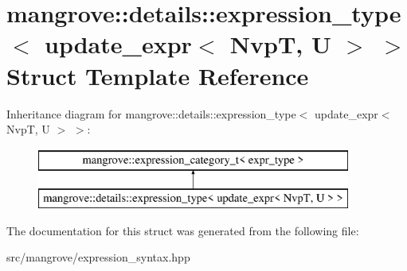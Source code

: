 \hypertarget{structmangrove_1_1details_1_1expression__type_3_01update__expr_3_01NvpT_00_01U_01_4_01_4}{}\section{mangrove\+:\+:details\+:\+:expression\+\_\+type$<$ update\+\_\+expr$<$ NvpT, U $>$ $>$ Struct Template Reference}
\label{structmangrove_1_1details_1_1expression__type_3_01update__expr_3_01NvpT_00_01U_01_4_01_4}
Inheritance diagram for mangrove\+:\+:details\+:\+:expression\+\_\+type$<$ update\+\_\+expr$<$ NvpT, U $>$ $>$\+:\begin{figure}[H]
\begin{center}
\leavevmode
\includegraphics[height=2.000000cm]{structmangrove_1_1details_1_1expression__type_3_01update__expr_3_01NvpT_00_01U_01_4_01_4}
\end{center}
\end{figure}


The documentation for this struct was generated from the following file\+:\begin{DoxyCompactItemize}
\item 
src/mangrove/expression\+\_\+syntax.\+hpp\end{DoxyCompactItemize}
